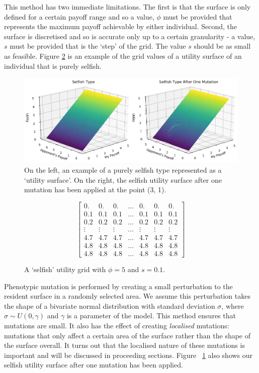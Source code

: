 \documentclass[11pt]{book}
\newcommand*{\np}{\par\noindent\newline}
\begin{document}
\np This method has two immediate limitations. 
The first is that the surface is only defined for a certain payoff range and so a value, $\phi$ must be provided that represents the maximum payoff achievable by either individual.
Second, the surface is discretised and so is accurate only up to a certain granularity - a value, $s$ must be provided that is the `step' of the grid.
The value $s$ should be as small as feasible. 
Figure \ref{selfishUtilityGrid} is an example of the grid values of a utility surface of an individual that is purely selfish.

\begin{figure}
	\centering
	\includegraphics[scale=0.55]{resources/selfish_and_one_mutation.png}
	\caption{On the left, an example of a purely selfish type represented as a `utility surface'.
On the right, the selfish utility surface after one mutation has been applied at the point (3, 1).
	}
	\label{selfishUtilitySurface}
\end{figure}

\begin{figure}
\[
	\begin{bmatrix} 
	0. & 0. & 0. & \dots & 0. & 0. & 0.\\
	0.1 & 0.1 & 0.1 & \dots & 0.1 & 0.1 & 0.1\\
	0.2 & 0.2 & 0.2 & \dots & 0.2 & 0.2 & 0.2\\
	\vdots & \vdots & \vdots & \dots & \vdots &\vdots &\vdots\\
	4.7 & 4.7 & 4.7 & \dots & 4.7 & 4.7 & 4.7\\
	4.8 & 4.8 & 4.8 & \dots & 4.8 & 4.8 & 4.8\\
	4.8 & 4.8 & 4.8 & \dots & 4.8 & 4.8 & 4.8 
	\end{bmatrix}
\]
\caption{A `selfish' utility grid with $\phi = 5$ and $s = 0.1$.}
\label{selfishUtilityGrid}
\end{figure}

\np Phenotypic mutation is performed by creating a small perturbation to the resident surface in a randomly selected area.
We assume this perturbation takes the shape of a bivariate normal distribution with standard deviation $\sigma$, where $\sigma \sim U(0,\gamma)$ and $\gamma$ is a parameter of the model.
This method ensures that mutations are small.
It also has the effect of creating \textit{localised} mutations: mutations that only affect a certain area of the surface rather than the shape of the surface overall.
It turns out that the localised nature of these mutations is important and will be discussed in proceeding sections.
Figure ~\ref{selfishUtilitySurface} also shows our selfish utility surface after one mutation has been applied.
\end{document}
